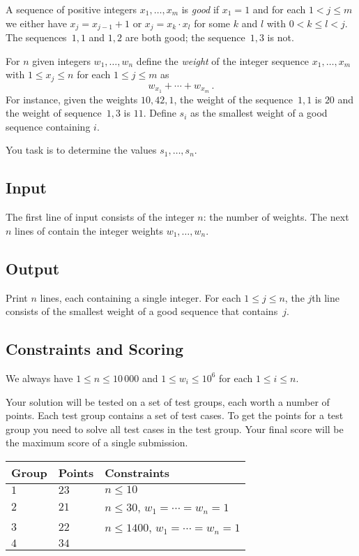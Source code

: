 
A sequence of positive integers $x_1,\ldots,x_m$ is \emph{good} if  $x_1 = 1$ and for each $1 < j \leq m$ we either have $x_j=x_{j-1}+1$ or $x_j=x_k\cdot x_l$ for some $k$ and $l$ with $0< k\leq l< j$.
The sequences~$1,1$ and $1,2$ are both good; the sequence~$1,3$ is not.

For  $n$ given integers $w_1,\ldots,w_n$ define 
the \emph{weight} of the integer sequence $x_1,\ldots,x_m$ with $1\leq x_j \leq n$ for each $1\leq j\leq m$ as
\[ w_{x_1} +\cdots +w_{x_m}\,.\] 
For instance, given the weights $10, 42, 1$, the weight of the sequence~$1,1$ is $20$ and the weight of sequence~$1,3$ is $11$.
Define $s_i$ as the smallest weight of a good sequence containing $i$.

You task is to determine the values $s_1,\ldots ,s_n$.

\subsection*{Input}

The first line of input consists of the integer $n$: the number of weights.
The next $n$ lines of contain the integer weights $w_1, \ldots, w_n$.

\subsection*{Output}

Print $n$ lines, each containing a single integer.
For each $1\leq j \leq n$, the $j$th line consists of the smallest weight of a good sequence that contains~$j$.

\subsection{Constraints and Scoring}

We always have
$1\leq n \leq 10\,000$ %
and
$1\leq w_i \leq 10^6$ for each $1\leq i \leq n$.%

Your solution will be tested on a set of test groups, each worth a number of points.
Each test group contains a set of test cases.
To get the points for a test group you need to solve all test cases in the test group.
Your final score will be the maximum score of a single submission.

\medskip
\begin{tabular}{lll}
Group & Points & Constraints \\\hline
$1$   & $23$ & $n\leq 10$ \\
$2$   & $21$ & $n\leq 30$, $w_1=\cdots=w_n = 1$ \\
$3$   & $22$ & $n\leq 1400$, $w_1=\cdots=w_n = 1$ \\
$4$   & $34$ & 
\end{tabular}
